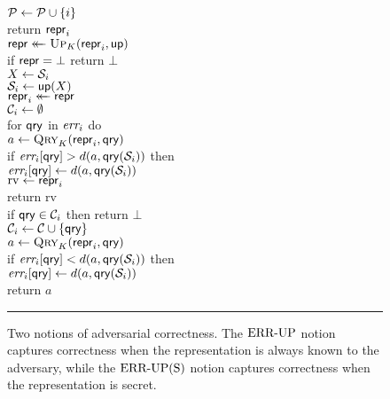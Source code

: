 \begin{figure}[t]
{    \\[2pt]
     $\mathcal{P} \gets \mathcal{P} \cup \{i\}$ \\
      return $\mathsf{repr}_i$
  }
  {
    \\[2pt]
      $\mathsf{repr} \mathrel{\leftarrow\mkern-14mu\leftarrow} \textsc{Up}_K(\mathsf{repr}_i, \mathsf{up})$\\
      if $\mathsf{repr} = \bot$ return $\bot$\\
      $X \gets \mathcal{S}_i$ \\
      $\mathcal{S}_i \gets \mathsf{up}(X)$\\
      $\mathsf{repr}_i \mathrel{\leftarrow\mkern-14mu\leftarrow} \mathsf{repr}$\\
      $\mathcal{C}_i \gets \emptyset$\\
      for $\mathsf{qry}$ in $\textit{err}_i$ do\\
      \tab $a \gets \textsc{Qry}_K(\mathsf{repr}_i, \mathsf{qry})$\\
      \tab if $\textit{err}_i[\mathsf{qry}] > d(a,\mathsf{qry}(\mathcal{S}_i))$ then\\
      \tab\tab$\textit{err}_i[\mathsf{qry}] \gets d(a,\mathsf{qry}(\mathcal{S}_i))$\\
      $\mathrm{rv} \gets \mathsf{repr}_i$ \\
      return $\mathrm{rv}$
      \medskip
}
{
    \\[2pt]
      if $\mathsf{qry} \in \mathcal{C}_i$ then return $\bot$\\
      $\mathcal{C}_i \gets \mathcal{C} \cup \{\mathsf{qry}\}$\\
      $a \gets \textsc{Qry}_K(\mathsf{repr}_i, \mathsf{qry})$\\
      if $\textit{err}_i[\mathsf{qry}] < d(a,\mathsf{qry}(\mathcal{S}_i))$ then\\
      \tab$\textit{err}_i[\mathsf{qry}] \gets d(a,\mathsf{qry}(\mathcal{S}_i))$\\
      return $a$
  }
  \caption{Two notions of adversarial correctness. The $\textnormal{ERR\mbox{-}UP}$ notion captures correctness when the representation is always known to the adversary, while the $\textnormal{ERR\mbox{-}UP(S)}$ notion captures correctness when the representation is secret.}
  \vspace{6pt}\hrule
  \label{fig:security}
\end{figure}
